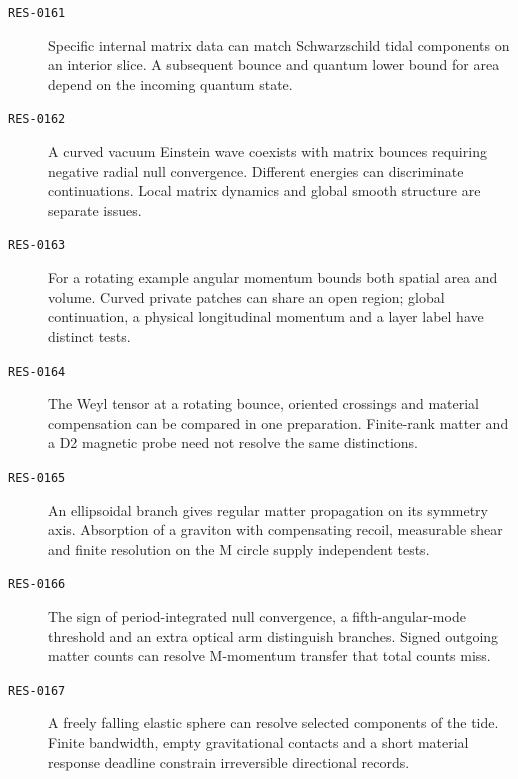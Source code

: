 \begin{description}
\item[\textnormal{\texttt{RES-0161}}] Specific internal matrix data can match Schwarzschild tidal components on an interior slice. A subsequent bounce and quantum lower bound for area depend on the incoming quantum state.
\item[\textnormal{\texttt{RES-0162}}] A curved vacuum Einstein wave coexists with matrix bounces requiring negative radial null convergence. Different energies can discriminate continuations. Local matrix dynamics and global smooth structure are separate issues.
\item[\textnormal{\texttt{RES-0163}}] For a rotating example angular momentum bounds both spatial area and volume. Curved private patches can share an open region; global continuation, a physical longitudinal momentum and a layer label have distinct tests.
\item[\textnormal{\texttt{RES-0164}}] The Weyl tensor at a rotating bounce, oriented crossings and material compensation can be compared in one preparation. Finite-rank matter and a D2 magnetic probe need not resolve the same distinctions.
\item[\textnormal{\texttt{RES-0165}}] An ellipsoidal branch gives regular matter propagation on its symmetry axis. Absorption of a graviton with compensating recoil, measurable shear and finite resolution on the M circle supply independent tests.
\item[\textnormal{\texttt{RES-0166}}] The sign of period-integrated null convergence, a fifth-angular-mode threshold and an extra optical arm distinguish branches. Signed outgoing matter counts can resolve M-momentum transfer that total counts miss.
\item[\textnormal{\texttt{RES-0167}}] A freely falling elastic sphere can resolve selected components of the tide. Finite bandwidth, empty gravitational contacts and a short material response deadline constrain irreversible directional records.
\end{description}

